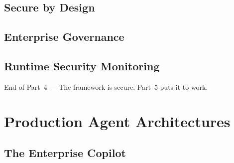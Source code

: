 \documentclass[
  11pt,
  twoside,
  openright
]{book}
\makeatletter
\renewcommand{\cleardoublepage}{%
  \clearpage
  \if@twoside
    \ifodd\c@page
    \else
      \thispagestyle{empty}%
      \hbox{}%
      \newpage
      \if@twocolumn\hbox{}\newpage\fi
    \fi
  \fi
}
\newcommand{\partclose}[1]{%
  \cleardoublepage
  \vspace*{\fill}
  \begin{center}
    \sffamily\Large\color{BookBlue}#1
  \end{center}
  \vspace*{\fill}
  \cleardoublepage
}
\makeatother
\begin{document}
\chapter{Secure by Design}
\label{ch:secure-by-design}

\chapter{Enterprise Governance}
\label{ch:enterprise-governance}

\chapter{Runtime Security Monitoring}
\label{ch:runtime-security}

\partclose{End of Part~4 --- The framework is secure.
Part~5 puts it to work.}

\part{Production Agent Architectures}
\label{part:production-architectures}


\chapter{The Enterprise Copilot}
\label{ch:enterprise-copilot}
\end{document}
